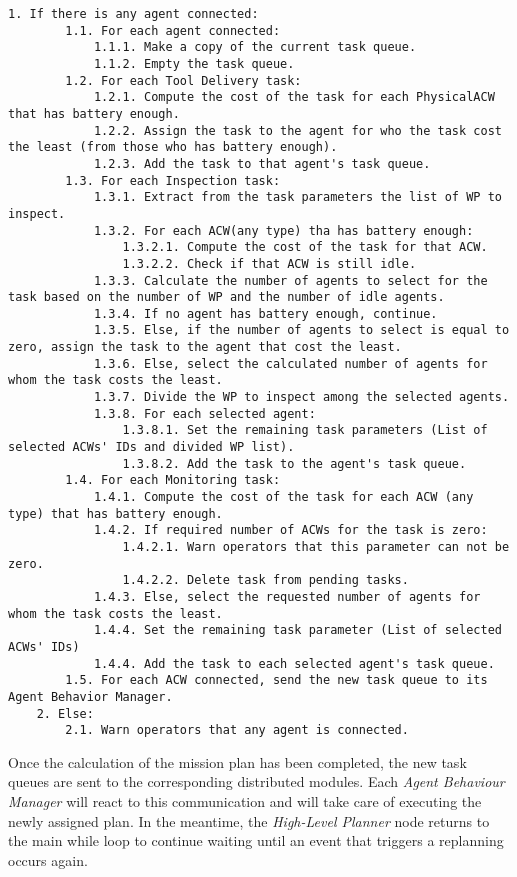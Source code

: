 \begin{lstlisting}[caption={Simplified task planning function's pseudocode}, breaklines=true, label=ps:performTaskAllocation]
	1. If there is any agent connected:
		1.1. For each agent connected:
			1.1.1. Make a copy of the current task queue.
			1.1.2. Empty the task queue.
		1.2. For each Tool Delivery task:
			1.2.1. Compute the cost of the task for each PhysicalACW that has battery enough.
			1.2.2. Assign the task to the agent for who the task cost the least (from those who has battery enough).
			1.2.3. Add the task to that agent's task queue.
		1.3. For each Inspection task:
			1.3.1. Extract from the task parameters the list of WP to inspect.
			1.3.2. For each ACW(any type) tha has battery enough:
				1.3.2.1. Compute the cost of the task for that ACW. 
				1.3.2.2. Check if that ACW is still idle.
			1.3.3. Calculate the number of agents to select for the task based on the number of WP and the number of idle agents.
			1.3.4. If no agent has battery enough, continue.
			1.3.5. Else, if the number of agents to select is equal to zero, assign the task to the agent that cost the least.
			1.3.6. Else, select the calculated number of agents for whom the task costs the least.
			1.3.7. Divide the WP to inspect among the selected agents.
			1.3.8. For each selected agent:
				1.3.8.1. Set the remaining task parameters (List of selected ACWs' IDs and divided WP list).
				1.3.8.2. Add the task to the agent's task queue.
		1.4. For each Monitoring task:
			1.4.1. Compute the cost of the task for each ACW (any type) that has battery enough.
			1.4.2. If required number of ACWs for the task is zero:
				1.4.2.1. Warn operators that this parameter can not be zero.
				1.4.2.2. Delete task from pending tasks.
			1.4.3. Else, select the requested number of agents for whom the task costs the least.
			1.4.4. Set the remaining task parameter (List of selected ACWs' IDs)
			1.4.4. Add the task to each selected agent's task queue.
		1.5. For each ACW connected, send the new task queue to its Agent Behavior Manager.
	2. Else:
		2.1. Warn operators that any agent is connected.
\end{lstlisting}

Once the calculation of the mission plan has been completed, the new task queues are sent to the corresponding distributed modules. Each \emph{Agent Behaviour Manager} will react to this communication and will take care of executing the newly assigned plan. In the meantime, the \emph{High-Level Planner} node returns to the main while loop to continue waiting until an event that triggers a replanning occurs again.

